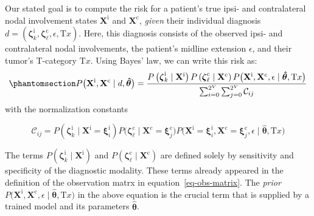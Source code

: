\documentclass[
  sn-mathphys-num,
]{sn-jnl}
\begin{document}
Our stated goal is to compute the risk for a patient's true ipsi- and
contralateral nodal involvement states \(\mathbf{X}^\text{i}\) and
\(\mathbf{X}^\text{c}\), \emph{given} their individual diagnosis
\(d = \left( \boldsymbol{\zeta}^\text{i}_k, \boldsymbol{\zeta}^\text{c}_\ell, \epsilon, \text{T}x \right)\).
Here, this diagnosis consists of the observed ipsi- and contralateral
nodal involvements, the patient's midline extension \(\epsilon\), and
their tumor's T-category \(\text{T}x\). Using Bayes' law, we can write
this risk as:
%
\begin{equation}\phantomsection\label{eq-uni-bayes-law}{
P \big( \mathbf{X}^\text{i}, \mathbf{X}^\text{c} \mid d, \boldsymbol{\hat{\theta}} \big)
= \frac{P \left( \boldsymbol{\zeta}^\text{i}_k \mid \mathbf{X}^\text{i} \right) P \left( \boldsymbol{\zeta}^\text{c}_\ell \mid \mathbf{X}^\text{c} \right) P \big( \mathbf{X}^\text{i}, \mathbf{X}^\text{c}, \epsilon \mid \boldsymbol{\hat{\theta}}, \text{T}x \big)}
{\sum_{i=0}^{2^V} \sum_{j=0}^{2^V} \mathcal{C}_{ij}}
}\end{equation}
%
with the normalization constants

\[
\mathcal{C}_{ij} = P \left( \boldsymbol{\zeta}^\text{i}_k \mid \mathbf{X}^\text{i}=\boldsymbol{\xi}^\text{i}_i \right) P \big( \boldsymbol{\zeta}^\text{c}_\ell \mid \mathbf{X}^\text{c}=\boldsymbol{\xi}^\text{c}_j \big) P \big( \mathbf{X}^\text{i}=\boldsymbol{\xi}^\text{i}_i, \mathbf{X}^\text{c}=\boldsymbol{\xi}^\text{c}_j, \epsilon \mid \boldsymbol{\hat{\theta}}, \text{T}x \big)
\]

The terms
\(P \left( \boldsymbol{\zeta}^\text{i}_k \mid \mathbf{X}^\text{i} \right)\)
and
\(P \left( \boldsymbol{\zeta}^\text{c}_\ell \mid \mathbf{X}^\text{c} \right)\)
are defined solely by sensitivity and specificity of the diagnostic
modality. These terms already appeared in the definition of the
observation matrx in equation~\ref{eq-obs-matrix}. The \emph{prior}
\(P \big( \mathbf{X}^\text{i}, \mathbf{X}^\text{c}, \epsilon \mid \boldsymbol{\hat{\theta}}, \text{T}x \big)\)
in the above equation is the crucial term that is supplied by a trained
model and its parameters \(\boldsymbol{\hat{\theta}}\).
\end{document}
